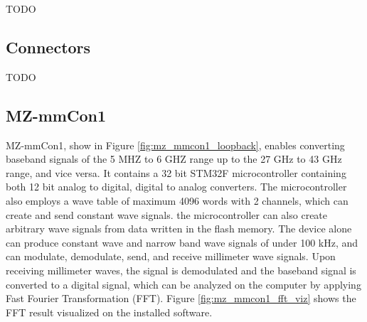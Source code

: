\documentclass[a4paper,12pt]{report}
\begin{document}
TODO

\subsection{Connectors}

TODO

\subsection{MZ-mmCon1}

MZ-mmCon1, show in Figure \ref{fig:mz_mmcon1_loopback},
enables converting baseband signals of the 5 MHZ to 6 GHZ range
up to the 27 GHz to 43 GHz range, and vice versa.
It contains a 32 bit STM32F microcontroller
containing both 12 bit analog to digital, digital to analog converters.
The microcontroller also employs
a wave table of maximum 4096 words with 2 channels,
which can create and send constant wave signals.
the microcontroller can also create arbitrary wave signals from
data written in the flash memory.
The device alone can produce constant wave and narrow band wave signals
of under 100 kHz, and can modulate, demodulate, send, and receive
millimeter wave signals.
Upon receiving millimeter waves,
the signal is demodulated and the baseband signal is converted to a digital signal,
which can be analyzed on the computer by applying Fast Fourier Transformation (FFT).
Figure \ref{fig:mz_mmcon1_fft_viz} shows the FFT result visualized on the installed software.
\end{document}
